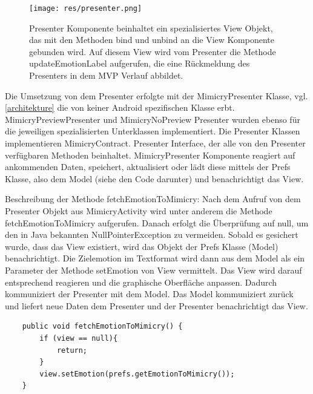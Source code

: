\begin{figure}[!ht]
    \centering\texttt{[image: res/presenter.png]}
\caption{Presenter Komponente beinhaltet ein spezialisiertes View Objekt, das mit den Methoden bind und unbind an die View Komponente gebunden wird. Auf diesem View wird vom Presenter die Methode updateEmotionLabel aufgerufen, die eine Rückmeldung des Presenters in dem MVP Verlauf abbildet.}
\label{presenter}
\end{figure}

Die Umsetzung von dem Presenter erfolgte mit der MimicryPresenter Klasse, vgl.\ref{architekture} die von keiner Android spezifischen Klasse erbt. MimicryPreviewPresenter und MimicryNoPreview Presenter wurden ebenso für die jeweiligen spezialisierten Unterklassen implementiert. Die Presenter Klassen implementieren MimicryContract. Presenter Interface, der alle von den Presenter verfügbaren Methoden beinhaltet. 
MimicryPresenter Komponente reagiert auf ankommenden Daten, speichert, aktualisiert oder lädt diese mittels der Prefs Klasse, also dem Model (siehe den Code darunter) und benachrichtigt das View.

Beschreibung der Methode fetchEmotionToMimicry:
Nach dem Aufruf von dem Presenter Objekt aus MimicryActivity wird unter anderem die Methode fetchEmotionToMimicry aufgerufen. Danach erfolgt die Überprüfung auf null, um den in Java bekannten NullPointerException zu vermeiden. Sobald es gesichert wurde, dass das View existiert, wird das Objekt der Prefs Klasse (Model) benachrichtigt. Die Zielemotion im Textformat wird dann aus dem Model als ein Parameter der Methode setEmotion von View vermittelt. Das View wird darauf entsprechend reagieren und die graphische Oberfläche anpassen. Dadurch kommuniziert der Presenter mit dem Model. Das Model kommuniziert zurück und liefert neue Daten dem Presenter und der Presenter benachrichtigt das View.
\begin{verbatim}
    public void fetchEmotionToMimicry() {
        if (view == null){
            return;
        }
        view.setEmotion(prefs.getEmotionToMimicry());
    }
\end{verbatim}
